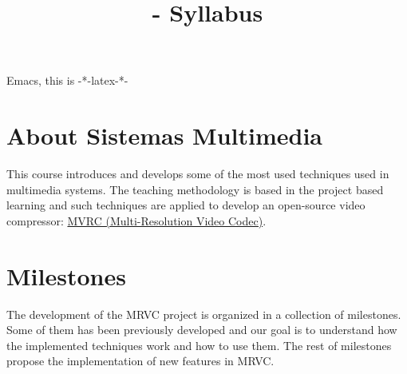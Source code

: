  Emacs, this is -*-latex-*-


\title{\SM{} - Syllabus}

\maketitle

\section{About Sistemas Multimedia}

This course introduces and develops some of the most used techniques
used in multimedia systems. The teaching methodology is based in the
project based learning and such techniques are applied to develop an
open-source video
compressor: \href{https://github.com/Sistemas-Multimedia/MRVC}{MVRC
(Multi-Resolution Video Codec)}.

\section{Milestones}

The development of the MRVC project is organized in a collection of
milestones. Some of them has been previously developed and our goal is
to understand how the implemented techniques work and how to use
them. The rest of milestones propose the implementation of new
features in MRVC.

